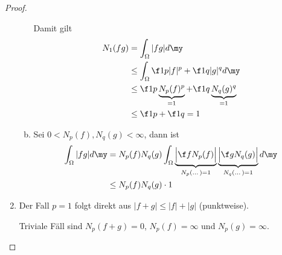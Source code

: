 \documentclass{mycourse}
\begin{document}
\begin{st}
\begin{proof}
\begin{enumerate}[1)]
\begin{enumerate}[a)]
						Damit gilt
						\begin{align*}
							N_1(fg) 
							&= \int_{\Omega} |fg| d\my \\
							&\le \int_{\Omega} \f 1p |f|^p + \f 1q |g|^q d\my \\
							&\le \f 1p \underbrace{N_p(f)^p}_{=1} + \f 1q \underbrace{N_q(g)^q}_{=1} \\
							&\le \f 1p + \f 1q = 1
						\end{align*}
					\item
						Sei $0 < N_p(f), N_q(g) < \infty$, dann ist
						\begin{align*}
							\int_{\Omega}|fg| d\my
							&= N_p(f)N_q(g) \int_{\Omega} \underbrace{\Big| \f f{N_p(f)} \Big|}_{N_p(\dots)=1} \underbrace{\Big| \f g{N_q(g)} \Big|}_{N_q(\dots)=1} d\my \\
							&\le N_p(f) N_q(g) \cdot 1
						\end{align*}
				\end{enumerate}
			\item
				Der Fall $p=1$ folgt direkt aus $|f+g| \le |f| + |g|$ (punktweise).

				Triviale Fäll sind $N_p(f+g) = 0$, $N_p(f) = \infty$ und $N_p(g) = \infty$.


\end{enumerate}
\end{proof}
\end{st}
\end{document}
